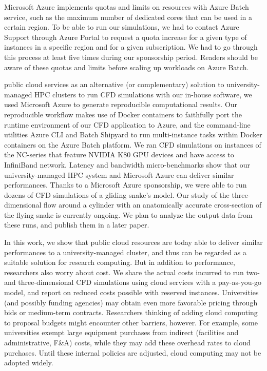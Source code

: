 \documentclass[10pt,journal,compsoc]{IEEEtran}
\begin{document}
Microsoft Azure implements quotas and limits on resources with Azure Batch service, such as the maximum number of dedicated cores that can be used in a certain region.
To be able to run our simulations, we had to contact Azure Support through Azure Portal to request a quota increase for a given type of instances in a specific region and for a given subscription.
We had to go through this process at least five times during our sponsorship period.
Readers should be aware of these quotas and limits before scaling up workloads on Azure Batch.

\bigskip

 public cloud services as an alternative (or complementary) solution to university-managed HPC clusters to run CFD simulations with our in-house software, we used Microsoft Azure to generate reproducible computational results.
Our reproducible workflow makes use of Docker containers to faithfully port the runtime environment of our CFD application to Azure,
and the command-line utilities Azure CLI and Batch Shipyard to run multi-instance tasks within Docker containers on the Azure Batch platform.
We ran CFD simulations on instances of the NC-series that feature NVIDIA K80 GPU devices and have access to InfiniBand network.
Latency and bandwidth micro-benchmarks show that our university-managed HPC system and Microsoft Azure can deliver similar performances.
Thanks to a Microsoft Azure sponsorship, we were able to run dozens of CFD simulations of a gliding snake's model.
Our study of the three-dimensional flow around a cylinder with an anatomically accurate cross-section of the flying snake is currently ongoing. 
We plan to analyze the output data from these runs, and publish them in a later paper.

In this work, we show that public cloud resources are today able to deliver similar performances to a university-managed cluster, and thus can be regarded as a suitable solution for research computing.
But in addition to performance, researchers also worry about cost.
We share the actual costs incurred to run two- and three-dimensional CFD simulations  using cloud services with a pay-as-you-go model, and report on reduced costs possible with reserved instances.
Universities (and possibly funding agencies) may obtain even more favorable pricing through bids or medium-term contracts.
Researchers thinking of adding cloud computing to proposal budgets might encounter other barriers, however.
For example, some universities exempt large equipment purchases from indirect (facilities and administrative, F\&A)  costs, while they may add these overhead rates to cloud purchases. 
Until these internal policies are adjusted, cloud computing may not be adopted widely.
\end{document}
